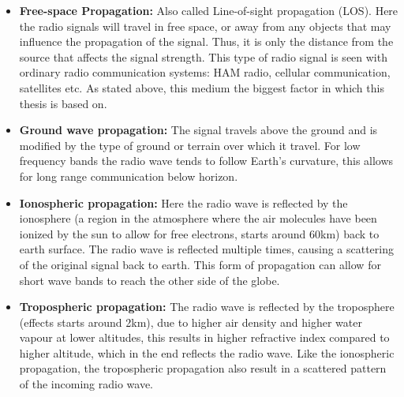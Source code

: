 \begin{itemize}
  \item \textbf{Free-space Propagation:} Also called Line-of-sight propagation (LOS). Here the radio signals will travel in free space, or away from any objects that may influence the propagation of the signal. Thus, it is only the distance from the source that affects the signal strength. This type of radio signal is seen with ordinary radio communication systems: HAM radio, cellular communication, satellites etc. As stated above, this medium the biggest factor in which this thesis is based on. 
  \item \textbf{Ground wave propagation:} The signal travels above the ground and is modified by the type of ground or terrain over which it travel. For low frequency bands the radio wave tends to follow Earth's curvature, this allows for long range communication below horizon.  
  \item \textbf{Ionospheric propagation:} Here the radio wave is reflected by the ionosphere (a region in the atmosphere where the air molecules have been ionized by the sun to allow for free electrons, starts around 60km) back to earth surface. The radio wave is reflected multiple times, causing a scattering of the original signal back to earth. This form of propagation can allow for short wave bands to reach the other side of the globe.
  \item \textbf{Tropospheric propagation:} The radio wave is reflected by the troposphere (effects starts around 2km), due to higher air density and higher water vapour at lower altitudes, this results in higher refractive index compared to higher altitude, which in the end reflects the radio wave. Like the ionospheric propagation, the tropospheric propagation also result in a scattered pattern of the incoming radio wave. 
\end{itemize}


